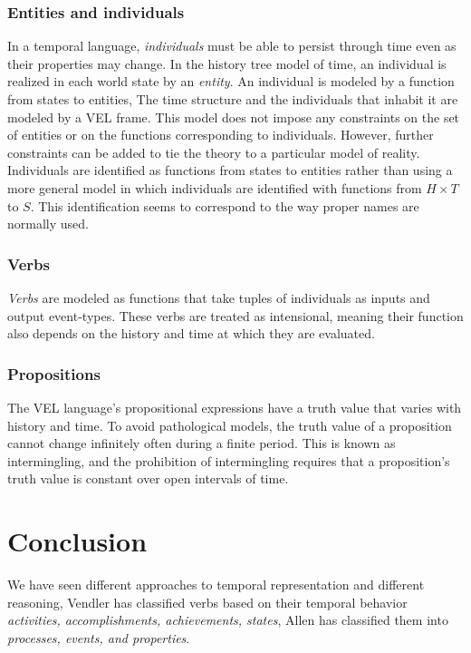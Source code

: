 \subsubsection{Entities and individuals}
In a temporal language, \textit{individuals} must be able to persist through time even as their properties may change.
In the history tree model of time, an individual is realized in each world state by an \textit{entity}.
An individual is modeled by a function from states to entities, The time structure and the individuals that inhabit it are modeled by a VEL frame. This model does not impose any constraints on the set of entities or on the functions corresponding to individuals.
However, further constraints can be added to tie the theory to a particular model of reality.
Individuals are identified as functions from states to entities rather than using a more general model in which individuals are identified with functions from $H \times T$ to $S$. This identification seems to correspond to the way proper names are normally used.

\subsubsection{Verbs}
\textit{Verbs} are modeled as functions that take tuples of individuals as inputs and output event-types.
These verbs are treated as intensional, meaning their function also depends on the history and time at which they are evaluated.
\subsubsection{Propositions}
The VEL language's propositional expressions have a truth value that varies with history and time. To avoid pathological models, the truth value of a proposition cannot change infinitely often during a finite period. This is known as intermingling, and the prohibition of intermingling requires that a proposition's truth value is constant over open intervals of time. 


\section{Conclusion}
We have seen different approaches to temporal representation and different reasoning, 
Vendler has classified verbs based on their temporal behavior \textit{activities, accomplishments, achievements, states},
Allen has classified them into \textit{processes, events, and properties}.

